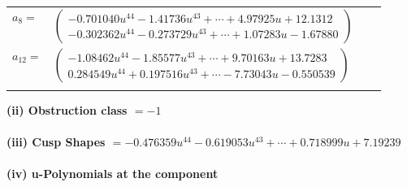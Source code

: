 \documentclass[1p]{elsarticle_modified}
\theoremstyle{definition}
\begin{document}
\begin{tabular}{m{7pt} m{180pt} m{7pt} m{180pt} }
\flushright $a_{8}=$&$\begin{pmatrix}-0.701040 u^{44}-1.41736 u^{43}+\cdots+4.97925 u+12.1312\\-0.302362 u^{44}-0.273729 u^{43}+\cdots+1.07283 u-1.67880\end{pmatrix}$ \\
\flushright $a_{12}=$&$\begin{pmatrix}-1.08462 u^{44}-1.85577 u^{43}+\cdots+9.70163 u+13.7283\\0.284549 u^{44}+0.197516 u^{43}+\cdots-7.73043 u-0.550539\end{pmatrix}$\\&\end{tabular}
\flushleft \textbf{(ii) Obstruction class $= -1$}\\~\\
\flushleft \textbf{(iii) Cusp Shapes $= -0.476359 u^{44}-0.619053 u^{43}+\cdots+0.718999 u+7.19239$}\\~\\
\newpage\renewcommand{\arraystretch}{1}
\flushleft \textbf{(iv) u-Polynomials at the component}\newline \\
\end{document}
